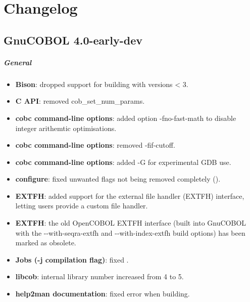 \chapter{Changelog}

\section{GnuCOBOL 4.0-early-dev}

\paragraph{General}
\begin{itemize}
\item \textbf{Bison}: dropped support for building with versions < 3.
\item \textbf{C API}: removed cob\_set\_num\_params.
\item \textbf{cobc command-line options}: added option -fno-fast-math to disable integer arithemtic optimisations.
\item \textbf{cobc command-line options}: removed -fif-cutoff.
\item \textbf{cobc command-line options}: added -G for experimental GDB use.
\item \textbf{configure}: fixed unwanted flags not being removed completely ().
\item \textbf{EXTFH}: added support for the external file handler (EXTFH) interface, letting users provide a custom file handler.
\item \textbf{EXTFH}: the old OpenCOBOL EXTFH interface (built into GnuCOBOL with the -{}-with-seqra-extfh and -{}-with-index-extfh build options) has been marked as obsolete.
\item \textbf{Jobs (-j compilation flag)}: fixed .
\item \textbf{libcob}: internal library number increased from 4 to 5.
\item \textbf{help2man documentation}: fixed error when building.
\end{itemize}

